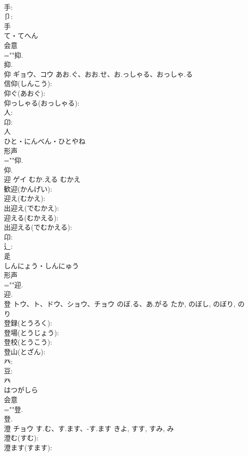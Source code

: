 \documentclass[8pt]{extreport}
\begin{document}
\begin{CJK}{UTF8}{min}
\\	手: 
\\	卩: 
\\	手	
\\	て・てへん	
\\	会意 
\\	=""抑.
\\	抑.
\\	仰	ギョウ、コウ	あお.ぐ、おお.せ、お.っしゃる、おっしゃ.る		
\\	信仰(しんこう): 
\\	仰ぐ(あおぐ): 
\\	仰っしゃる(おっしゃる): 
\\	人: 
\\	卬: 
\\	人	
\\	ひと・にんべん・ひとやね	
\\	形声 
\\	=""仰.
\\	仰.
\\	迎	ゲイ	むか.える	むかえ	
\\	歓迎(かんげい): 
\\	迎え(むかえ): 
\\	出迎え(でむかえ): 
\\	迎える(むかえる): 
\\	出迎える(でむかえる): 
\\	卬: 
\\	辶: 
\\	辵	
\\	しんにょう・しんにゅう	
\\	形声 
\\	=""迎.
\\	迎.
\\	登	トウ、ト、ドウ、ショウ、チョウ	のぼ.る、あ.がる	たか, のぼし, のぼり, のり	
\\	登録(とうろく): 
\\	登場(とうじょう): 
\\	登校(とうこう): 
\\	登山(とざん): 
\\	癶: 
\\	豆: 
\\	癶	
\\	はつがしら	
\\	会意 
\\	=""登.
\\	登.
\\	澄	チョウ	す.む、す.ます、-す.ます	きよ, すす, すみ, み	
\\	澄む(すむ): 
\\	澄ます(すます): 

\end{CJK}
\end{document}
